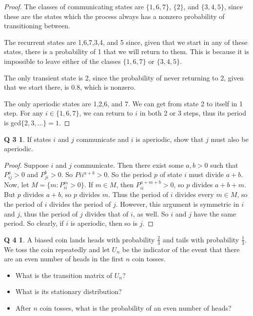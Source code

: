 \documentclass[12pt]{article}
\theoremstyle{definition}
\newtheorem*{prob3}{Q 3}
\newtheorem*{prob4}{Q 4}
\begin{document}
\begin{proof}

The classes of communicating states are $\{1,6,7\}$, $\{2\}$, and $\{3,4,5\}$, since these are the states which the process always has a nonzero probability of transitioning between.

The recurrent states are 1,6,7,3,4, and 5 since, given that we start in any of these states, there is a probability of 1 that we will return to them.  This is because it is impossible to leave either of the classes $\{1,6,7\}$ or $\{3,4,5\}$.

The only transient state is 2, since the probability of never returning to 2, given that we start there, is 0.8, which is nonzero.

The only aperiodic states are 1,2,6, and 7.  We can get from state 2 to itself in 1 step.  For any $i \in \{1,6,7\}$, we can return to $i$ in both 2 or 3 steps, thus its period is gcd$\{2,3,...\} = 1$.

\end{proof}

\pagebreak
\begin{prob3}
If states $i$ and $j$ communicate and $i$ is aperiodic, show that $j$ must also be aperiodic.
\end{prob3}

\begin{proof}

Suppose $i$ and $j$ communicate.  Then there exist some $a,b > 0$ such that $P_{ij}^a > 0$ and $P_{ji}^b > 0$.  So $P{ii}^{a+b} > 0$.  So the period $p$ of state $i$ must divide $a + b$.  Now, let $M = \{ m : P_{ii}^m > 0 \}$.  If $m \in M$, then $P_{ii}^{a + m + b} > 0$, so $p$ divides $a+b+m$.  But $p$ divides $a+b$, so $p$ divides $m$.  Thus the period of $i$ divides every $m \in M$, so the period of $i$ divides the period of $j$.  However, this argument is symmetric in $i$ and $j$, thus the period of $j$ divides that of $i$, as well.  So $i$ and $j$ have the same period.  So clearly, if $i$ is aperiodic, then so is $j$.

\end{proof}

\begin{prob4}
A biased coin lands heads with probability $\frac23$ and tails with probability $\frac13$. We toss the coin repeatedly and let $U_n$ be the indicator of the event that there are an even number of heads in the first $n$ coin tosses.
\begin{itemize}
\item What is the transition matrix of $U_n$?
\item What is its stationary distribution?
\item After $n$ coin tosses, what is the probability of an even number of heads?
\end{itemize}
\end{prob4}
\end{document}
